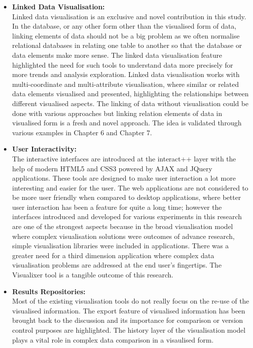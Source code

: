 \begin{itemize}
\item \textbf{Linked Data Visualisation:}\\

Linked data visualisation is an exclusive and novel contribution in this study. In the database, or any other form other than the visualised form of data, linking elements of data should not be a big problem as we often normalise relational databases in relating one table to another so that the database or data elements make more sense. The linked data visualisation feature highlighted the need for such tools to understand data more precisely for more trends and analysis exploration. Linked data visualisation works with multi-coordinate and multi-attribute visualisation, where similar or related data elements visualised and presented, highlighting the relationships between different visualised aspects. The linking of data without visualisation could be done with various approaches but linking relation elements of data in visualised form is a fresh and novel approach. The idea is validated through various examples in Chapter 6 and Chapter 7. 

\item \textbf{User Interactivity:} \\

The interactive interfaces are introduced at the interact++ layer with the help of modern HTML5 and CSS3 powered by AJAX and JQuery applications. These tools are designed to make user interaction a lot more interesting and easier for the user. The web applications are not considered to be more user friendly when compared to desktop applications, where better user interaction has been a feature for quite a long time; however the interfaces introduced and developed for various experiments in this research are one of the strongest aspects because in the broad visualisation model where complex visualisation solutions were outcomes of advance research,  simple visualisation libraries were included in applications. There was a greater need for a third dimension application where complex data visualisation problems are addressed at the end user’s fingertips. The Visualixer tool is a tangible outcome of this research.

\item \textbf{Results Repositories:} \\

Most of the existing visualisation tools do not really focus on the re-use of the visualised information. The export feature of visualised information has been brought back to the discussion and its importance for comparison or version control purposes are highlighted. The history layer of the visualisation model plays a vital role in complex data comparison in a visaulised form.

\end{itemize}

